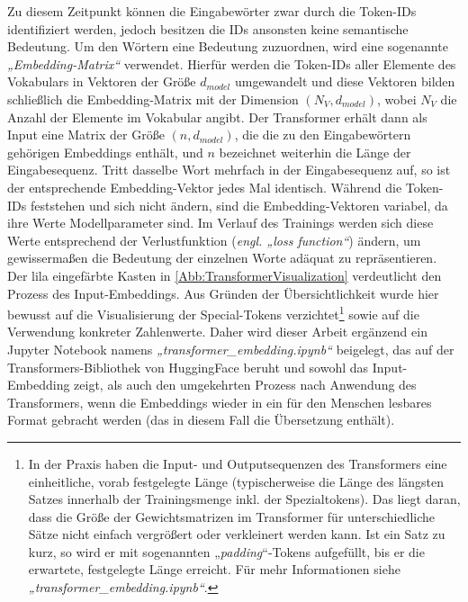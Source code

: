 Zu diesem Zeitpunkt können die Eingabewörter zwar durch die Token-IDs identifiziert werden, jedoch besitzen die IDs ansonsten keine semantische Bedeutung. Um den Wörtern eine Bedeutung zuzuordnen, wird eine sogenannte \emph{„Embedding-Matrix“} verwendet.  Hierfür werden die Token-IDs aller Elemente des Vokabulars in Vektoren der Größe $d_{model}$ umgewandelt und diese Vektoren bilden schließlich die Embedding-Matrix mit der Dimension $(N_V, d_{model})$, wobei $N_V$ die Anzahl der Elemente im Vokabular angibt. Der Transformer erhält dann als Input eine Matrix der Größe $(n, d_{model})$, die die zu den Eingabewörtern gehörigen Embeddings enthält, und $n$ bezeichnet weiterhin die Länge der Eingabesequenz. Tritt dasselbe Wort mehrfach in der Eingabesequenz auf, so ist der entsprechende Embedding-Vektor jedes Mal identisch. Während die Token-IDs feststehen und sich nicht ändern, sind die Embedding-Vektoren variabel, da ihre Werte Modellparameter sind. Im Verlauf des Trainings werden sich diese Werte entsprechend der Verlustfunktion (\emph{engl. „loss function“}) ändern, um gewissermaßen die Bedeutung der einzelnen Worte adäquat zu repräsentieren. Der lila eingefärbte Kasten in \cref{Abb:TransformerVisualization} verdeutlicht den Prozess des Input-Embeddings. Aus Gründen der Übersichtlichkeit wurde hier bewusst auf die Visualisierung der Special-Tokens verzichtet\footnote{In der Praxis haben die Input- und Outputsequenzen des Transformers eine einheitliche, vorab festgelegte Länge (typischerweise die Länge des längsten Satzes innerhalb der Trainingsmenge inkl. der Spezialtokens). Das liegt daran, dass die Größe der Gewichtsmatrizen im Transformer für unterschiedliche Sätze nicht einfach vergrößert oder verkleinert werden kann. Ist ein Satz zu kurz, so wird er mit sogenannten „\emph{padding}“-Tokens aufgefüllt, bis er die erwartete, festgelegte Länge erreicht. Für mehr Informationen siehe \emph{„transformer\_embedding.ipynb“}.} sowie auf die Verwendung konkreter Zahlenwerte. Daher wird dieser Arbeit ergänzend ein Jupyter Notebook namens \emph{„transformer\_embedding.ipynb“} beigelegt, das auf der Transformers-Bibliothek von HuggingFace \cite{Transformers_HuggingFace_Natural_Language} beruht und sowohl das Input-Embedding zeigt, als auch den umgekehrten Prozess nach Anwendung des Transformers, wenn die Embeddings wieder in ein für den Menschen lesbares Format gebracht werden (das in diesem Fall die Übersetzung enthält). 

